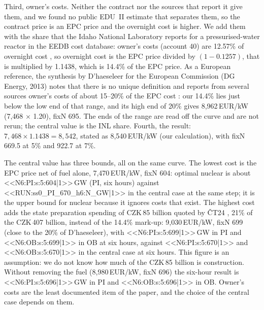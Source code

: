 Third, owner's costs. Neither the contract nor the sources that report it \citep{WNNKHNPplans,CT24Dukovany,ForbesDukovany} give them, and we found no public EDU~II estimate that separates them, so the contract price is an EPC price and the overnight cost is higher. We add them with the share that the Idaho National Laboratory reports for a pressurised-water reactor in the EEDB cost database: owner's costs (account 40) are 12.57\% of overnight cost \citep{INLowner}, so overnight cost is the EPC price divided by $(1-0.1257)$, that is multiplied by 1.1438, which is 14.4\% of the EPC price. As a European reference, the synthesis by D'haeseleer for the European Commission (DG Energy, 2013) notes that there is no unique definition and reports from several sources owner's costs of about 15--20\% of the EPC cost \citep{DHaeseleer2013}: our 14.4\% lies just below the low end of that range, and its high end of 20\% gives 8{,}962\,EUR/kW (7{,}468 $\times$ 1.20), fixN 695. The ends of the range are read off the curve and are not rerun; the central value is the INL share. Fourth, the result: $7{,}468\times1.1438=8{,}542$, stated as 8{,}540\,EUR/kW (our calculation), with fixN 669.5 at 5\% and 922.7 at 7\%.

The central value has three bounds, all on the same curve. The lowest cost is the EPC price net of fuel alone, 7{,}470\,EUR/kW, fixN 604: optimal nuclear is about <<N6:PI:s:5:604|1>>\,GW (PI, six hours) against <<RUN:ss0_PI_670_h6:N_GW|1>> in the central case at the same step; it is the upper bound for nuclear because it ignores costs that exist. The highest cost adds the state preparation spending of CZK\,85 billion quoted by \v{C}T24 \citep{CT24Dukovany}, 21\% of the CZK\,407 billion, instead of the 14.4\% mark-up: 9{,}030\,EUR/kW, fixN 699 (close to the 20\% of D'haeseleer), with <<N6:PI:s:5:699|1>>\,GW in PI and <<N6:OB:s:5:699|1>> in OB at six hours, against <<N6:PI:s:5:670|1>> and <<N6:OB:s:5:670|1>> in the central case at six hours. This figure is an assumption: we do not know how much of the CZK\,85 billion is construction. Without removing the fuel (8{,}980\,EUR/kW, fixN 696) the six-hour result is <<N6:PI:s:5:696|1>>\,GW in PI and <<N6:OB:s:5:696|1>> in OB. Owner's costs are the least documented item of the paper, and the choice of the central case depends on them.

